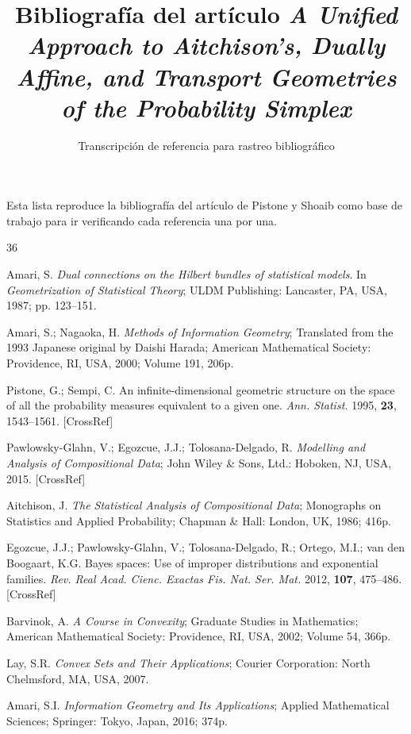 \documentclass[12pt]{article}
\title{Bibliografía del artículo \textit{A Unified Approach to Aitchison's, Dually Affine, and Transport Geometries of the Probability Simplex}}
\author{Transcripción de referencia para rastreo bibliográfico}
\date{}
\begin{document}
\maketitle

\noindent Esta lista reproduce la bibliografía del artículo de Pistone y Shoaib
como base de trabajo para ir verificando cada referencia una por una.

\begin{thebibliography}{36}

Amari, S. \textit{Dual connections on the Hilbert bundles of statistical models}.
In \textit{Geometrization of Statistical Theory}; ULDM Publishing:
Lancaster, PA, USA, 1987; pp. 123--151.

Amari, S.; Nagaoka, H. \textit{Methods of Information Geometry};
Translated from the 1993 Japanese original by Daishi Harada;
American Mathematical Society: Providence, RI, USA, 2000; Volume 191, 206p.

Pistone, G.; Sempi, C. An infinite-dimensional geometric structure on the space of all the probability measures equivalent to a given one.
\textit{Ann. Statist.} 1995, \textbf{23}, 1543--1561. [CrossRef]

Pawlowsky-Glahn, V.; Egozcue, J.J.; Tolosana-Delgado, R. \textit{Modelling and Analysis of Compositional Data};
John Wiley \& Sons, Ltd.: Hoboken, NJ, USA, 2015. [CrossRef]

Aitchison, J. \textit{The Statistical Analysis of Compositional Data};
Monographs on Statistics and Applied Probability; Chapman \& Hall:
London, UK, 1986; 416p.

Egozcue, J.J.; Pawlowsky-Glahn, V.; Tolosana-Delgado, R.; Ortego, M.I.;
van den Boogaart, K.G. Bayes spaces: Use of improper distributions and
exponential families. \textit{Rev. Real Acad. Cienc. Exactas Fis. Nat. Ser. Mat.}
2012, \textbf{107}, 475--486. [CrossRef]

Barvinok, A. \textit{A Course in Convexity}; Graduate Studies in Mathematics;
American Mathematical Society: Providence, RI, USA, 2002; Volume 54, 366p.

Lay, S.R. \textit{Convex Sets and Their Applications}; Courier Corporation:
North Chelmsford, MA, USA, 2007.

Amari, S.I. \textit{Information Geometry and Its Applications}; Applied Mathematical
Sciences; Springer: Tokyo, Japan, 2016; 374p.


\end{thebibliography}
\end{document}
